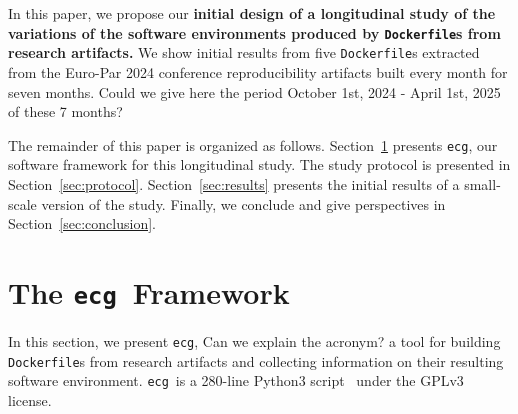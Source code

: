 \documentclass[sigconf,natbib=false]{acmart}
\newcommand{\df}{\texttt{Dockerfile}}
\newcommand{\ecg}{\texttt{ecg}}
\newcommand{\todo}[1]{{\color{red}{TODO: #1}}}
\newcommand{\fmc}[1]{{\color{magenta}#1}} %
\begin{document}
In this paper, we propose our \textbf{initial design of a longitudinal study of the variations of the software environments produced by \df s from research artifacts.}
We show initial results from five \df s extracted from the Euro-Par 2024 conference reproducibility artifacts built every month for seven months. \fmc{Could we give here the period October 1st, 2024 - April 1st, 2025 of these 7 months?}

% 

The remainder of this paper is organized as follows.
Section~\ref{sec:ecg} presents \ecg, our software framework for this longitudinal study.
The study protocol is presented in Section~\ref{sec:protocol}.
Section~\ref{sec:results} presents the initial results of a small-scale version of the study.
Finally, we conclude and give perspectives in Section~\ref{sec:conclusion}.

\section{The \ecg\ Framework}\label{sec:ecg}


In this section, we present \ecg, \fmc{Can we explain the acronym?} a tool for building \df s from research artifacts and collecting information on their resulting software environment.
\ecg\ is a 280-line Python3 script~\cite{ecg} under the GPLv3 license.
\end{document}
